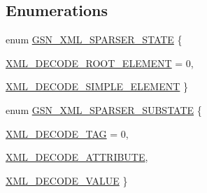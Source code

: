\subsection*{Enumerations}
\begin{DoxyCompactItemize}
\item 
enum \hyperlink{a00617_a933b08dd0c11d03cdb7673574f376355}{GSN\_\-XML\_\-SPARSER\_\-STATE} \{ \par
\hyperlink{a00617_a933b08dd0c11d03cdb7673574f376355a305cc95fb8eee17e2dd4ca3134ef2231}{XML\_\-DECODE\_\-ROOT\_\-ELEMENT} = 0, 
\par
\hyperlink{a00617_a933b08dd0c11d03cdb7673574f376355ac096650e0f481e1a6075edcc46c34e25}{XML\_\-DECODE\_\-SIMPLE\_\-ELEMENT}
 \}
\item 
enum \hyperlink{a00617_aef610642a09e23ef6afbf0a6cbb981a1}{GSN\_\-XML\_\-SPARSER\_\-SUBSTATE} \{ \par
\hyperlink{a00617_aef610642a09e23ef6afbf0a6cbb981a1a92cefb0b6441dd89da20e557c560e274}{XML\_\-DECODE\_\-TAG} = 0, 
\par
\hyperlink{a00617_aef610642a09e23ef6afbf0a6cbb981a1a6862d48353a5c0cc37ebc127fddbab27}{XML\_\-DECODE\_\-ATTRIBUTE}, 
\par
\hyperlink{a00617_aef610642a09e23ef6afbf0a6cbb981a1abd2c700ad78b01d6b96da215aed657b2}{XML\_\-DECODE\_\-VALUE}
 \}
\end{DoxyCompactItemize}
